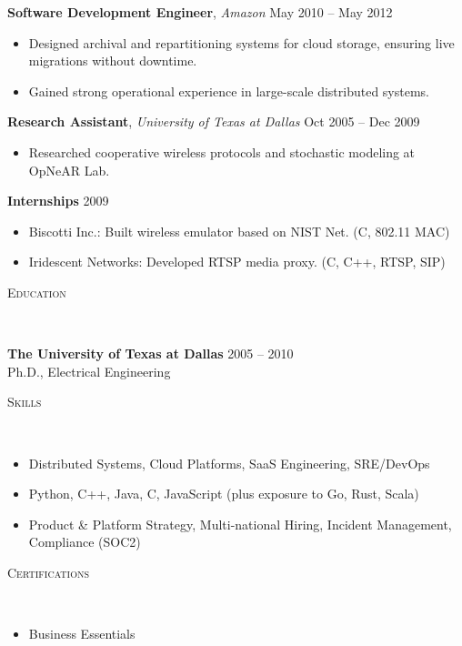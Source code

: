 \documentclass[9pt]{article}
\newenvironment{changemargin}[2]{%
  \begin{list}{}{%
    \setlength{\topsep}{0pt}%
    \setlength{\leftmargin}{#1}%
    \setlength{\rightmargin}{#2}%
    \setlength{\listparindent}{\parindent}%
    \setlength{\itemindent}{\parindent}%
    \setlength{\parsep}{\parskip}%
  }%
  \item[]}{\end{list}
}
\newcommand{\lineover}{
        \begin{changemargin}{-0.05in}{-0.05in}
                \vspace*{-8pt}
                \hrulefill \\
                \vspace*{-2pt}
        \end{changemargin}
}
\newcommand{\header}[1]{
        \begin{changemargin}{-0.5in}{-0.5in}
                \scshape{#1}\\
        \lineover
        \end{changemargin}
}
\newenvironment{body} {
        \vspace*{-16pt}
        \begin{changemargin}{-0.25in}{-0.5in}
  }
        {\end{changemargin}
}
\begin{document}
\begin{body}
\textbf{Software Development Engineer}, \emph{Amazon} \hfill May 2010 -- May 2012 \\
\begin{itemize}
  \item Designed archival and repartitioning systems for cloud storage, ensuring live migrations without downtime.
  \item Gained strong operational experience in large-scale distributed systems.
\end{itemize}

\textbf{Research Assistant}, \emph{University of Texas at Dallas} \hfill Oct 2005 -- Dec 2009 \\
\begin{itemize}
  \item Researched cooperative wireless protocols and stochastic modeling at OpNeAR Lab.
\end{itemize}

\textbf{Internships} \hfill 2009 \\
\begin{itemize}
  \item Biscotti Inc.: Built wireless emulator based on NIST Net. (C, 802.11 MAC)
  \item Iridescent Networks: Developed RTSP media proxy. (C, C++, RTSP, SIP)
\end{itemize}

\end{body}

\header{Education}
\begin{body}
\textbf{The University of Texas at Dallas} \hfill 2005 -- 2010 \\
Ph.D., Electrical Engineering
\end{body}

\header{Skills}
\begin{body}
\begin{itemize}
  \item Distributed Systems, Cloud Platforms, SaaS Engineering, SRE/DevOps
  \item Python, C++, Java, C, JavaScript (plus exposure to Go, Rust, Scala)
  \item Product \& Platform Strategy, Multi-national Hiring, Incident Management, Compliance (SOC2)
\end{itemize}
\end{body}

\header{Certifications}
\begin{body}
\begin{itemize}
  \item Business Essentials
\end{itemize}
\end{body}
\end{document}
